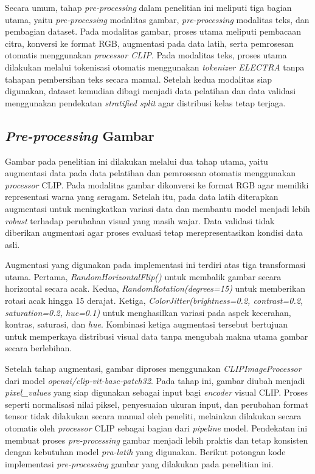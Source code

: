 Secara umum, tahap \textit{pre-processing} dalam penelitian ini meliputi tiga bagian utama, yaitu \textit{pre-processing} modalitas gambar, \textit{pre-processing} modalitas teks, dan pembagian dataset. Pada modalitas gambar, proses utama meliputi pembacaan citra, konversi ke format RGB, augmentasi pada data latih, serta pemrosesan otomatis menggunakan \textit{processor CLIP}. Pada modalitas teks, proses utama dilakukan melalui tokenisasi otomatis menggunakan \textit{tokenizer ELECTRA} tanpa tahapan pembersihan teks secara manual. Setelah kedua modalitas siap digunakan, dataset kemudian dibagi menjadi data pelatihan dan data validasi menggunakan pendekatan \textit{stratified split} agar distribusi kelas tetap terjaga.

\subsection{\textit{Pre-processing} Gambar} \label{IV.Preprocessing.Gambar}
Gambar pada penelitian ini dilakukan melalui dua tahap utama, yaitu augmentasi data pada data pelatihan dan pemrosesan otomatis menggunakan \textit{processor} CLIP.  Pada modalitas gambar dikonversi ke format RGB agar memiliki representasi warna yang seragam. Setelah itu, pada data latih diterapkan augmentasi untuk meningkatkan variasi data dan membantu model menjadi lebih \textit{robust} terhadap perubahan visual yang masih wajar. Data validasi tidak diberikan augmentasi agar proses evaluasi tetap merepresentasikan kondisi data asli.

Augmentasi yang digunakan pada implementasi ini terdiri atas tiga transformasi utama. Pertama, \textit{RandomHorizontalFlip()} untuk membalik gambar secara horizontal secara acak. Kedua, \textit{RandomRotation(degrees=15)} untuk memberikan rotasi acak hingga 15 derajat. Ketiga, \textit{ColorJitter(brightness=0.2, contrast=0.2, saturation=0.2, hue=0.1)} untuk menghasilkan variasi pada aspek kecerahan, kontras, saturasi, dan \textit{hue}. Kombinasi ketiga augmentasi tersebut bertujuan untuk memperkaya distribusi visual data tanpa mengubah makna utama gambar secara berlebihan.

Setelah tahap augmentasi, gambar diproses menggunakan \textit{CLIPImageProcessor} dari model \textit{openai/clip-vit-base-patch32}. Pada tahap ini, gambar diubah menjadi \textit{pixel\_values} yang siap digunakan sebagai input bagi \textit{encoder} visual CLIP. Proses seperti normalisasi nilai piksel, penyesuaian ukuran input, dan perubahan format tensor tidak dilakukan secara manual oleh peneliti, melainkan dilakukan secara otomatis oleh \textit{processor} CLIP sebagai bagian dari \textit{pipeline} model. Pendekatan ini membuat proses \textit{pre-processing} gambar menjadi lebih praktis dan tetap konsisten dengan kebutuhan model \textit{pra-latih} yang digunakan.
Berikut potongan kode implementasi \textit{pre-processing} gambar yang dilakukan pada penelitian ini.

